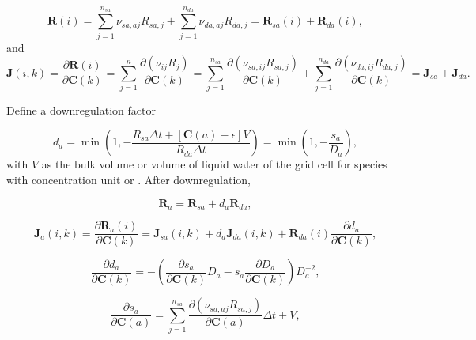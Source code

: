 \documentclass[gmd, manuscript]{copernicus}
\begin{document}
\begin{equation}
\mathbf{R}(i) = \sum_{j=1}^{n_{sa}} \nu_{sa,aj} R_{sa,j} + \sum_{j=1}^{n_{da}}
\nu_{da,aj} R_{da,j}=\mathbf{R}_{sa} (i)+\mathbf{R}_{da} (i),
\end{equation}
and
\begin{equation}
\mathbf{J}(i,k)=\frac{\partial \mathbf{R}(i)}{\partial \mathbf{C}(k)}
=\sum_{j=1}^n \frac{\partial (\nu_{ij}R_j)}{\partial \mathbf{C}(k)} =
\sum_{j=1}^{n_{sa}} \frac{\partial (\nu_{sa,ij}R_{sa,j})}{\partial
\mathbf{C}(k)} + \sum_{j=1}^{n_{da}} \frac{\partial
(\nu_{da,ij}R_{da,j})}{\partial \mathbf{C}(k)} =
\mathbf{J}_{sa}+\mathbf{J}_{da}.
\end{equation}


Define a downregulation factor  

\begin{equation}
d_a=\min\left(1, -\frac{R_{sa} \Delta t + \left[\mathbf{C}(a)-\epsilon\right]
V} {R_{da} \Delta t}\right)=\min\left(1, -\frac{s_a}{D_a}\right),
\end{equation} 
with $V$ as the bulk volume or volume of liquid water of the grid cell for
species with concentration unit  or . After
downregulation,

\begin{equation}
\mathbf{R}_a=\mathbf{R}_{sa}+d_a \mathbf{R}_{da},
\end{equation}

\begin{equation}
\mathbf{J}_a (i,k)=\frac{\partial \mathbf{R}_a(i)}{\partial \mathbf{C}(k)}
=\mathbf{J}_{sa} (i,k)+d_a \mathbf{J}_{da} (i,k)+\mathbf{R}_{da} (i)
\frac{\partial d_a}{\partial \mathbf{C}(k)}, 
\end{equation}

\begin{equation}
\frac{\partial d_a}{\partial \mathbf{C}(k)} =-\left(\frac{\partial
s_a}{\partial \mathbf{C}(k)} D_a - s_a \frac{\partial D_a}{\partial
\mathbf{C}(k)}\right)D_a^{-2}, 
\end{equation}

\begin{equation}
\frac{\partial s_a}{\partial \mathbf{C}(a)} =\sum_{j=1}^{n_{sa}}
\frac{\partial (\nu_{sa,aj}R_{sa,j})}{\partial \mathbf{C}(a)} \Delta t + V, 
\end{equation}
\end{document}

